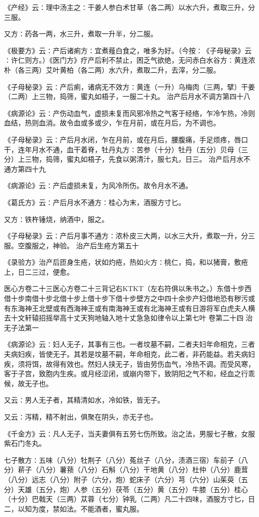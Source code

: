 \documentclass[a4paper,12pt,UTF8,twoside]{ctexbook}
\begin{document}
《产经》云∶理中汤主之∶干姜人参白术甘草（各二两）以水六升，煮取三升，分三服。

又方∶药各一两，水三升，煮取一升半，分二服。

《极要方》云∶产后诸痢方∶宜煮薤白食之，唯多为好。（今按∶《子母秘录》云∶许仁则方。）《医门方》疗产后利不禁止，困乏气欲绝，无问赤白水谷方∶黄连浓朴（各三两）艾叶黄柏（各二两）水六升，煮取二升，去滓，分二服。

《子母秘录》云∶产后痢，诸病无不效方∶黄连（一升）乌梅肉（三两，擘）干姜（二两）上三物，捣筛，蜜丸如梧子，一服二十丸。
治产后月水不调方第四十八

《病源论》云∶产伤动血气，虚损未复而风邪冷热之气客于经络，乍冷乍热，冷则血结，热则血消。故令血或多或少，乍在月前，或在月后，为不调也。

《子母秘录》云∶产后月水闭，乍在月前，或在月后，腰腹痛，手足烦疼，唇口干，连年月水不通，血干着脊，牡丹丸方∶苦参（十分）牡丹（五分）贝母（三分）上三物，捣筛，蜜丸如梧子，先食以粥清汁，服七丸，日三。
治产后月水不通方第四十九

《病源论》云∶产后虚损未复，为风冷所伤。故令月水不通。

《葛氏方》云∶产后月水不通方∶桂心为末，酒服方寸匕。

又方∶铁杵锤烧，纳酒中，服之。

《子母秘录》云∶产后月事不通方∶浓朴皮三大两，以水三大升，煮取一升，分三服。空腹服之，神验。
治产后生疮方第五十

《录验方》治产后匝身生疮，状如灼疮，热如火方∶桃仁，捣，和以猪膏，敷疮上，日二三过，便愈。

医心方卷二十三医心方卷二十三背记右KTKT（左右符俱以朱书之。）东借十步西借十步南借十步北借十步上借十步下借十步壁方之中四十余步产妇借地恐有秽污或有东海神王北壁或有西海神王或有南海神王或有北海神王或有日游将军白虎夫人横去十文轩辕招摇举高十丈天狗地轴入地十丈急急如律令以上第七叶
卷第二十四
治无子法第一

《病源论》云∶妇人无子，其事有三也。一者坟墓不嗣，二者夫妇年命相克，三者夫病妇疾，皆使无子。其若是坟墓不嗣，年命相克，此二者，非药能益。若夫病妇疾，须将饵，故得有效也。然妇人挟无子，皆由劳伤血气，冷热不调。而受风寒，客于子宫，致胞内生疾。或月经涩闭，或崩内带下，致阴阳之气不和，经血之行乖候，故无子也。

又云∶男人无子者，其精清如水，冷如铁，皆无子。

又云∶泻精，精不射出，俱聚在阴头，亦无子也。

《千金方》云∶凡人无子，当夫妻俱有五劳七伤所致。治之法，男服七子散，女服紫石门冬丸。

七子散方∶五味（八分）牡荆子（八分）菟丝子（八分，渍酒三宿）车前子（八分）菥子（八分）薯蓣（八分）石斛（八分）干地黄（八分）杜仲（八分）鹿茸（八分）远志（八分）附子（六分，炮）蛇床子（六分）芎（六分）山茱萸（五分）天雄（五分，炮）人参（五分）茯苓（五分）黄（五分）牛膝（五分）桂心（十分）巴戟天（三两）苁蓉（七分）钟乳（二两）凡二十四味，酒服方寸匕，日二，以知为度，禁如法。不能酒者，蜜丸服。
\end{document}
